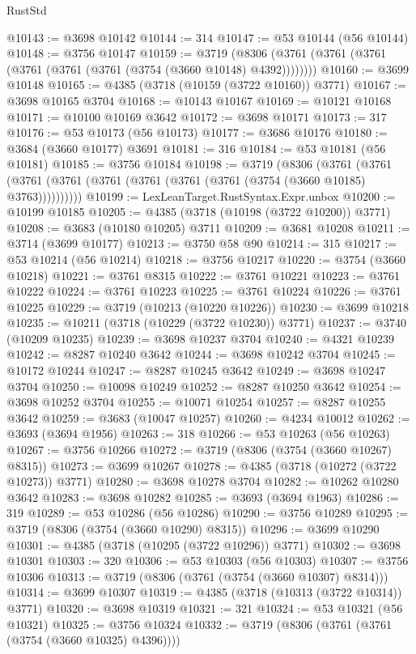 \begin{lexlean}{RustStd}
\begin{coremodule}
@10143 := @3698 @10142
@10144 := 314
@10147 := @53 @10144 (@56 @10144)
@10148 := @3756 @10147
@10159 := @3719 (@8306 (@3761 (@3761 (@3761 (@3761 (@3761 (@3761 (@3754 (@3660 @10148) @4392))))))))
@10160 := @3699 @10148
@10165 := @4385 (@3718 (@10159 (@3722 @10160)) @3771)
@10167 := @3698 @10165 @3704
@10168 := @10143 @10167
@10169 := @10121 @10168
@10171 := @10100 @10169 @3642
@10172 := @3698 @10171
@10173 := 317
@10176 := @53 @10173 (@56 @10173)
@10177 := @3686 @10176
@10180 := @3684 (@3660 @10177) @3691
@10181 := 316
@10184 := @53 @10181 (@56 @10181)
@10185 := @3756 @10184
@10198 := @3719
    (@8306
      (@3761 (@3761 (@3761 (@3761 (@3761 (@3761 (@3761 (@3761 (@3754 (@3660 @10185) @3763))))))))))
@10199 := LexLeanTarget.RustSyntax.Expr.unbox
@10200 := @10199 @10185
@10205 := @4385 (@3718 (@10198 (@3722 @10200)) @3771)
@10208 := @3683 (@10180 @10205) @3711
@10209 := @3681 @10208
@10211 := @3714 (@3699 @10177)
@10213 := @3750 @58 @90
@10214 := 315
@10217 := @53 @10214 (@56 @10214)
@10218 := @3756 @10217
@10220 := @3754 (@3660 @10218)
@10221 := @3761 @8315
@10222 := @3761 @10221
@10223 := @3761 @10222
@10224 := @3761 @10223
@10225 := @3761 @10224
@10226 := @3761 @10225
@10229 := @3719 (@10213 (@10220 @10226))
@10230 := @3699 @10218
@10235 := @10211 (@3718 (@10229 (@3722 @10230)) @3771)
@10237 := @3740 (@10209 @10235)
@10239 := @3698 @10237 @3704
@10240 := @4321 @10239
@10242 := @8287 @10240 @3642
@10244 := @3698 @10242 @3704
@10245 := @10172 @10244
@10247 := @8287 @10245 @3642
@10249 := @3698 @10247 @3704
@10250 := @10098 @10249
@10252 := @8287 @10250 @3642
@10254 := @3698 @10252 @3704
@10255 := @10071 @10254
@10257 := @8287 @10255 @3642
@10259 := @3683 (@10047 @10257)
@10260 := @4234 @10012
@10262 := @3693 (@3694 @1956)
@10263 := 318
@10266 := @53 @10263 (@56 @10263)
@10267 := @3756 @10266
@10272 := @3719 (@8306 (@3754 (@3660 @10267) @8315))
@10273 := @3699 @10267
@10278 := @4385 (@3718 (@10272 (@3722 @10273)) @3771)
@10280 := @3698 @10278 @3704
@10282 := @10262 @10280 @3642
@10283 := @3698 @10282
@10285 := @3693 (@3694 @1963)
@10286 := 319
@10289 := @53 @10286 (@56 @10286)
@10290 := @3756 @10289
@10295 := @3719 (@8306 (@3754 (@3660 @10290) @8315))
@10296 := @3699 @10290
@10301 := @4385 (@3718 (@10295 (@3722 @10296)) @3771)
@10302 := @3698 @10301
@10303 := 320
@10306 := @53 @10303 (@56 @10303)
@10307 := @3756 @10306
@10313 := @3719 (@8306 (@3761 (@3754 (@3660 @10307) @8314)))
@10314 := @3699 @10307
@10319 := @4385 (@3718 (@10313 (@3722 @10314)) @3771)
@10320 := @3698 @10319
@10321 := 321
@10324 := @53 @10321 (@56 @10321)
@10325 := @3756 @10324
@10332 := @3719 (@8306 (@3761 (@3761 (@3754 (@3660 @10325) @4396))))

\end{coremodule}
\end{lexlean}
